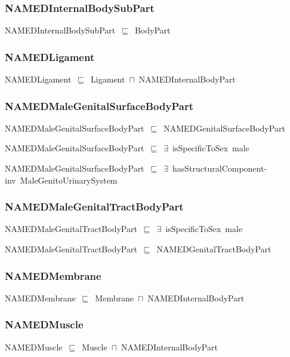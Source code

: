 \documentclass{article}
\begin{document}
\subsubsection*{NAMEDInternalBodySubPart}

NAMEDInternalBodySubPart~\ensuremath{\sqsubseteq}~BodyPart~

\subsubsection*{NAMEDLigament}

NAMEDLigament~\ensuremath{\sqsubseteq}~Ligament~\ensuremath{\sqcap}~NAMEDInternalBodyPart~

\subsubsection*{NAMEDMaleGenitalSurfaceBodyPart}

NAMEDMaleGenitalSurfaceBodyPart~\ensuremath{\sqsubseteq}~NAMEDGenitalSurfaceBodyPart~

NAMEDMaleGenitalSurfaceBodyPart~\ensuremath{\sqsubseteq}~\ensuremath{\exists}~isSpecificToSex~male~

NAMEDMaleGenitalSurfaceBodyPart~\ensuremath{\sqsubseteq}~\ensuremath{\exists}~hasStructuralComponent-inv~MaleGenitoUrinarySystem~

\subsubsection*{NAMEDMaleGenitalTractBodyPart}

NAMEDMaleGenitalTractBodyPart~\ensuremath{\sqsubseteq}~\ensuremath{\exists}~isSpecificToSex~male~

NAMEDMaleGenitalTractBodyPart~\ensuremath{\sqsubseteq}~NAMEDGenitalTractBodyPart~

\subsubsection*{NAMEDMembrane}

NAMEDMembrane~\ensuremath{\sqsubseteq}~Membrane~\ensuremath{\sqcap}~NAMEDInternalBodyPart~

\subsubsection*{NAMEDMuscle}

NAMEDMuscle~\ensuremath{\sqsubseteq}~Muscle~\ensuremath{\sqcap}~NAMEDInternalBodyPart~
\end{document}
